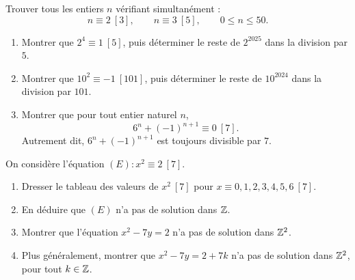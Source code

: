 
Trouver tous les entiers $n$ vérifiant simultanément :
$$
n \equiv 2\ [3], \qquad n \equiv 3\ [5], \qquad 0 \leqslant n \leqslant 50.
$$


\begin{enumerate}
	\item Montrer que $2^4 \equiv 1\ [5]$, puis déterminer le reste de $2^{2025}$ dans la division par $5$.

	\item Montrer que $10^2 \equiv -1\ [101]$, puis déterminer le reste de $10^{2024}$
	dans la division par $101$.

	\item Montrer que pour tout entier naturel $n$,
	$$
	6^n + (-1)^{n+1} \equiv 0\ [7].
	$$
	Autrement dit, $6^n + (-1)^{n+1}$ est toujours divisible par $7$.
\end{enumerate}



On considère l'équation $(E) : x^2 \equiv 2\ [7]$.

\begin{enumerate}
	\item Dresser le tableau des valeurs de $x^2\ [7]$ pour $x \equiv 0, 1, 2, 3, 4, 5, 6\ [7]$.
	\item En déduire que $(E)$ n'a pas de solution dans $\mathbb{Z}$.
	\item Montrer que l'équation $x^2 - 7y = 2$ n'a pas de solution dans $\mathbb{Z}^2$.
	\item Plus généralement, montrer que $x^2 - 7y = 2 + 7k$ n'a pas de solution dans $\mathbb{Z}^2$,
	pour tout $k \in \mathbb{Z}$.
\end{enumerate}



